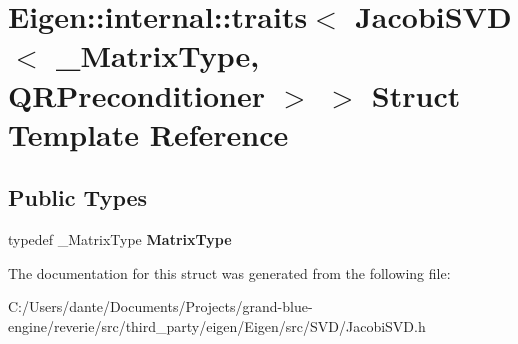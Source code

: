 \hypertarget{struct_eigen_1_1internal_1_1traits_3_01_jacobi_s_v_d_3_01___matrix_type_00_01_q_r_preconditioner_01_4_01_4}{}\section{Eigen\+::internal\+::traits$<$ Jacobi\+S\+VD$<$ \+\_\+\+Matrix\+Type, Q\+R\+Preconditioner $>$ $>$ Struct Template Reference}
\label{struct_eigen_1_1internal_1_1traits_3_01_jacobi_s_v_d_3_01___matrix_type_00_01_q_r_preconditioner_01_4_01_4}
\subsection*{Public Types}
\begin{DoxyCompactItemize}
\item 
\mbox{\label{struct_eigen_1_1internal_1_1traits_3_01_jacobi_s_v_d_3_01___matrix_type_00_01_q_r_preconditioner_01_4_01_4_a0c5efadd389b46f324bdee9e47f7c273}} 
typedef \+\_\+\+Matrix\+Type {\bfseries Matrix\+Type}
\end{DoxyCompactItemize}


The documentation for this struct was generated from the following file\+:\begin{DoxyCompactItemize}
\item 
C\+:/\+Users/dante/\+Documents/\+Projects/grand-\/blue-\/engine/reverie/src/third\+\_\+party/eigen/\+Eigen/src/\+S\+V\+D/Jacobi\+S\+V\+D.\+h\end{DoxyCompactItemize}
